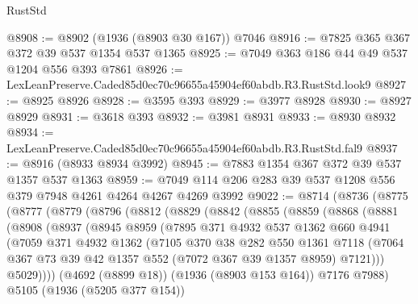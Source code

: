 \begin{lexlean}{RustStd}
\begin{coremodule}
@8908 := @8902 (@1936 (@8903 @30 @167)) @7046
@8916 := @7825 @365 @367 @372 @39 @537 @1354 @537 @1365
@8925 := @7049 @363 @186 @44 @49 @537 @1204 @556 @393 @7861
@8926 := LexLeanPreserve.Caded85d0ec70c96655a45904ef60abdb.R3.RustStd.look9
@8927 := @8925 @8926
@8928 := @3595 @393
@8929 := @3977 @8928
@8930 := @8927 @8929
@8931 := @3618 @393
@8932 := @3981 @8931
@8933 := @8930 @8932
@8934 := LexLeanPreserve.Caded85d0ec70c96655a45904ef60abdb.R3.RustStd.fal9
@8937 := @8916 (@8933 @8934 @3992)
@8945 := @7883 @1354 @367 @372 @39 @537 @1357 @537 @1363
@8959 := @7049 @114 @206 @283 @39 @537 @1208 @556 @379 @7948 @4261 @4264 @4267 @4269 @3992
@9022 := @8714
    (@8736
      (@8775
        (@8777
          (@8779
            (@8796
              (@8812
                (@8829
                  (@8842
                    (@8855
                      (@8859
                        (@8868
                          (@8881
                            (@8908
                              (@8937
                                (@8945
                                  @8959
                                  (@7895
                                    @371
                                    @4932
                                    @537
                                    @1362
                                    @660
                                    @4941
                                    (@7059
                                      @371
                                      @4932
                                      @1362
                                      (@7105
                                        @370
                                        @38
                                        @282
                                        @550
                                        @1361
                                        @7118
                                        (@7064
                                          @367
                                          @73
                                          @39
                                          @42
                                          @1357
                                          @552
                                          (@7072 @367 @39 @1357 @8959)
                                          @7121)))
                                    @5029))))
                            (@4692 (@8899 @18))
                            (@1936 (@8903 @153 @164))
                            @7176
                            @7988)
                          @5105
                          (@1936 (@5205 @377 @154))

\end{coremodule}
\end{lexlean}
